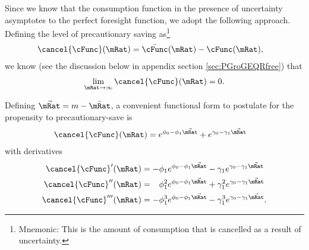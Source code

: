 \documentclass{\handout}
\begin{document}
Since we know that the consumption function in the presence of uncertainty asymptotes to the 
perfect foresight function, we adopt the following approach.  Defining the level of precautionary
saving as\footnote{Mnemonic: This is the amount of consumption that is cancelled as a result of uncertainty.}
\newcommand{\psav}{\cancel{c}}
\newcommand{\psavFunc}{\ensuremath{\cancel{\cFunc}}}
\begin{equation}\begin{gathered}\begin{aligned}
  \label{eq:pSavFunc}
  \psavFunc(\mRat) & =  \bar{\cFunc}(\mRat)-\cFunc(\mRat),
\end{aligned}\end{gathered}\end{equation}
we know (see the discussion below in appendix section \ref{sec:PGroGEQRfree}) that 
\begin{equation}\begin{gathered}\begin{aligned}
  \lim_{\mRat \rightarrow \infty} \psavFunc(\mRat) = 0
.
\end{aligned}\end{gathered}\end{equation}

Defining $\vec{\mRat}=m-\bar{\mRat}$, a convenient functional form to postulate for the
propensity to precautionary-save is
\begin{equation}\begin{gathered}\begin{aligned}
  \psavFunc(\mRat) & =  e^{\phi_{0}-\phi_{1} \vec{\mRat}}+e^{\gamma_{0}-\gamma_{1} \vec{\mRat}}
\end{aligned}\end{gathered}\end{equation}
with derivatives
\begin{equation}\begin{gathered}\begin{aligned}
    \psavFunc^{\prime}(\mRat) & =  -\phi_{1} e^{\phi_{0}-\phi_{1} \vec{\mRat}} - \gamma_{1} e^{\gamma_{0}-\gamma_{1} \vec{\mRat}}
\\  \psavFunc^{\prime\prime}(\mRat) & =  \phantom{-}\phi_{1}^{2} e^{\phi_{0}-\phi_{1} \vec{\mRat}} + \gamma_{1}^{2} e^{\gamma_{0}-\gamma_{1} \vec{\mRat}}
\\  \psavFunc^{\prime\prime\prime}(\mRat) & =  -\phi_{1}^{3} e^{\phi_{0}-\phi_{1} \vec{\mRat}} - \gamma_{1}^{3} e^{\gamma_{0}-\gamma_{1} \vec{\mRat}}
.
\end{aligned}\end{gathered}\end{equation}
\end{document}
